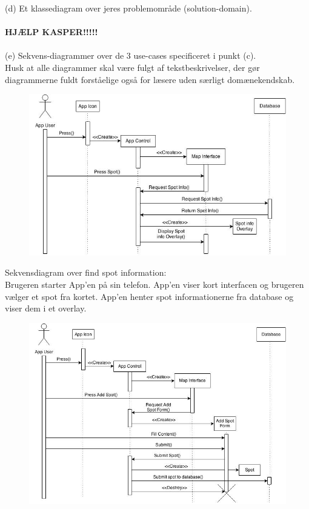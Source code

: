 \documentclass[12pt]{article}
\begin{document}
(d) Et klassediagram over jeres problemområde (solution-domain).\\\\
\textbf{HJÆLP KASPER!!!!!}\\\\
(e) Sekvens-diagrammer over de 3 use-cases specificeret i punkt (c).\\
Husk at alle diagrammer skal være fulgt af tekstbeskrivelser, der gør diagrammerne fuldt
forståelige også for læsere uden særligt domænekendskab.\\
\begin{figure}[h]
\includegraphics[scale = 0.5]{sekdia1}
\end{figure}

Sekvensdiagram over find spot information:\\
Brugeren starter App'en på sin telefon. App'en viser kort interfacen og brugeren vælger et spot fra kortet. 
App'en henter spot informationerne fra database og viser dem i et overlay.
\newpage

\begin{figure}[h]
\includegraphics[scale = 0.5]{sekdia2}
\end{figure}
\end{document}
